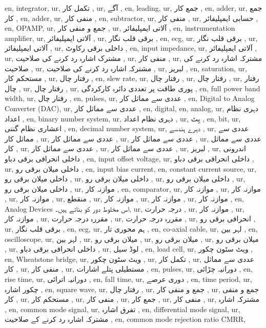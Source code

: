 en, integrator,
ur, تکمل کار ,
ur, آگے ,
en, leading,
ur, جمع کار ,
en, adder,
ur, جمع کار ,
en, adder,
ur, منفی کار ,
en, subtractor,
ur, منفی کار ,
ur, حسابی ایمپلیفائر ,
en, OPAMP,
ur, جمع و منفی کار ,
ur, آلاتی ایمپلیفائر ,
en, instrumentation amplifier,
ur, آلاتی ایمپلیفائر ,
ur, برقی قلب نگار ,
en, ecg,
ur, برقی قلب نگار ,
ur, آلاتی ایمپلیفائر ,
ur, داخلی برقی رکاوٹ ,
en, input impedance,
ur, آلاتی ایمپلیفائر ,
ur, مشترک اشارہ رد کرنے کی صلاحیت ,
ur, منفی کار ,
ur, مشترکہ اشارہ رد کرنے کی صلاحیت ,
ur, مشترکہ اشارہ رد کرنے کی صلاحیت ,
ur, لبریز ,
en, saturation,
ur, مستحکم کار ,
ur, رفتار چال ,
en, slew rate,
ur, رفتار چال ,
ur, رفتار چال ,
ur, رفتار چال ,
ur, رفتار چال ,
ur, پوری طاقت پر تعددی دائرہ کارکردگی ,
en, full power band width,
ur, رفتار چال ,
en, pulses,
ur, عددی سے مماثل کار ,
en, Digital to Analog Converter (DAC),
ur, عددی سے مماثل کار ,
en, digital,
en, analog,
ur, دہری نظام اعداد ,
en, binary number system,
ur, دہری نظام اعداد ,
ur, بِٹ ,
en, bit,
ur, اعشاری نظام گنتی ,
en, decimal number system,
ur, دہرے ہندسے ,
ur, عددی سے مماثل کار ,
ur, عددی سے مماثل کار ,
ur, عددی سے مماثل کار ,
ur, عددی سے مماثل کار ,
ur, عددی سے مماثل کار ,
ur, عددی سے مماثل کار ,
ur, لبریز ,
ur, اندرونی داخلی انحرافی برقی دباو ,
en, input offset voltage,
ur, داخلی انحرافی برقی دباو ,
ur, داخلی میلان برقی رو ,
en, input bias current,
en, constant current source,
ur, داخلی میلان برقی رو ,
ur, داخلی میلان برقی رو ,
ur, داخلی میلان برقی رو ,
ur, داخلی میلان برقی رو ,
ur, موازنہ کار ,
en, comparator,
ur, موازنہ کار ,
ur, موازنہ کار ,
ur, موازنہ کار ,
ur, منقطع ,
ur, موازنہ کار ,
ur, موازنہ کار ,
ur, موازنہ کار ,
en, Analog Devices اس مخلوط دور کو بناتے ہیں۔,
ur, درجہ حرارت ,
ur, موازنہ کار ,
ur, موازنہ کار ,
ur, مقررہ درجہ حرارت ,
ur, مقررہ درجہ حرارت ,
ur, انحرافی برقی رو ,
ur, برقی قلب نگار ,
en, ecg,
ur, ہم محوری تار ,
en, co-axial cable,
ur, لہر بین ,
en, oscilloscope,
ur, لہر بین ,
ur, میلان برقی رو ,
ur, میلان برقی رو ,
ur, میلان برقی رو ,
ur, داخلی انحرافی برقی دباو ,
ur, لوڈ سیل ,
en, load cell,
ur, ویٹ سٹون چکور ,
en, Wheatstone bridge,
ur, ویٹ سٹون چکور ,
ur, تکمل کار ,
ur, عددی سے مماثل کار ,
ur, منفی کار ,
ur, مستطیلی پتلے اشارات ,
en, pulses,
ur, دورانیہ چڑائی ,
en, rise time,
ur, دورانیہ اترائی ,
en, fall time,
ur, دوری عرصے ,
en, time period,
ur, چکور اشارہ ,
en, square wave,
ur, رفتار چال ,
ur, جمع و منفی کار ,
ur, جمع و منفی کار ,
ur, مستحکم کار ,
ur, منفی کار ,
ur, جمع کار ,
ur, منفی کار ,
ur, مشترکہ اشارہ ,
en, common mode signal,
ur, تفرق اشارہ ,
en, differential mode signal,
ur, مشترکہ اشارہ رد کرنے کے صلاحیت ,
en, common mode rejection ratio CMRR,
